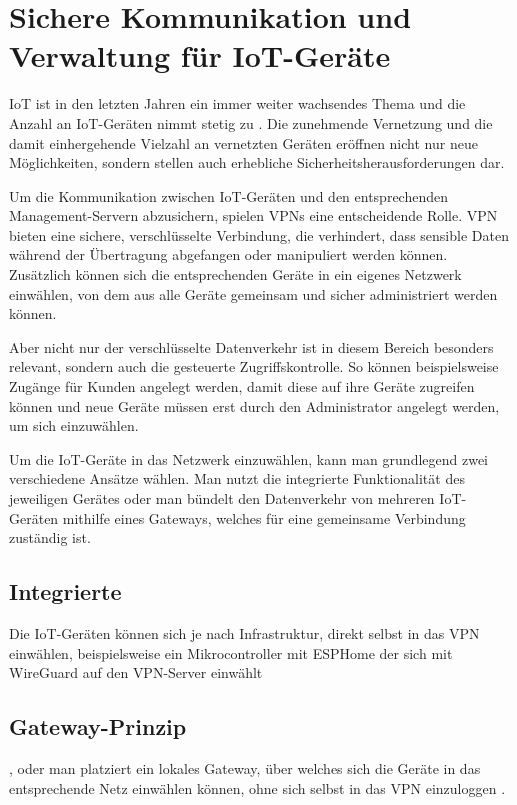 \section{Sichere Kommunikation und Verwaltung für \gls{IoT}-Geräte} \label{iot}

\gls{IoT} ist in den letzten Jahren ein immer weiter wachsendes Thema und die Anzahl an \gls{IoT}-Geräten nimmt stetig zu \cite{Statista_IoT_Devices_2030}. Die zunehmende Vernetzung und die damit einhergehende Vielzahl an vernetzten Geräten eröffnen nicht nur neue Möglichkeiten, sondern stellen auch erhebliche Sicherheitsherausforderungen dar.

Um die Kommunikation zwischen \gls{IoT}-Geräten und den entsprechenden Management-Servern abzusichern, spielen \gls{VPN}s eine entscheidende Rolle. \gls{VPN} bieten eine sichere, verschlüsselte Verbindung, die verhindert, dass sensible Daten während der Übertragung abgefangen oder manipuliert werden können. Zusätzlich können sich die entsprechenden Geräte in ein eigenes Netzwerk einwählen, von dem aus alle Geräte gemeinsam und sicher administriert werden können. 

Aber nicht nur der verschlüsselte Datenverkehr ist in diesem Bereich besonders relevant, sondern auch die gesteuerte Zugriffskontrolle. So können beispielsweise Zugänge für Kunden angelegt werden, damit diese auf ihre Geräte zugreifen können und neue Geräte müssen erst durch den Administrator angelegt werden, um sich einzuwählen.

Um die \gls{IoT}-Geräte in das Netzwerk einzuwählen, kann man grundlegend zwei verschiedene Ansätze wählen. Man nutzt die integrierte  Funktionalität des jeweiligen Gerätes oder man bündelt den Datenverkehr von mehreren \gls{IoT}-Geräten mithilfe eines Gateways, welches für eine gemeinsame  Verbindung zuständig ist.

\subsection{Integrierte }


Die \gls{IoT}-Geräten können sich je nach Infrastruktur, direkt selbst in das \gls{VPN} einwählen, beispielsweise ein Mikrocontroller mit ESPHome der sich mit WireGuard auf den \gls{VPN}-Server einwählt \cite{ESPHome_Wireguard}

\subsection{Gateway-Prinzip}

, oder man platziert ein lokales Gateway, über welches sich die Geräte in das entsprechende Netz einwählen können, ohne sich selbst in das \gls{VPN} einzuloggen \cite{IoT_OpenVPN_Raspberry}.